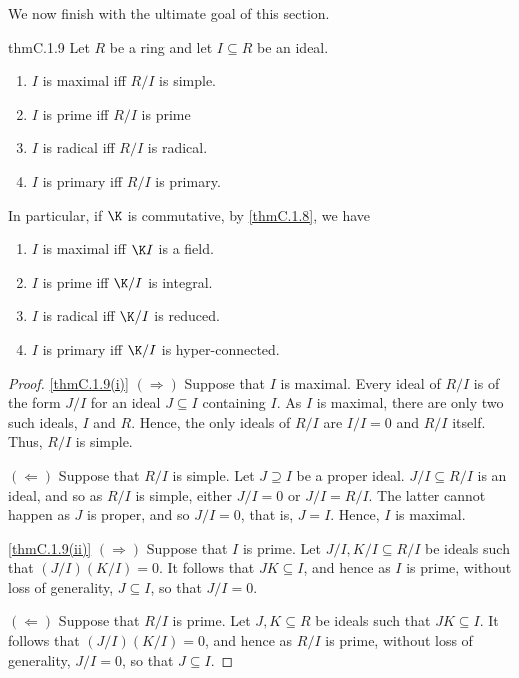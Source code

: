 We now finish with the ultimate goal of this section.
\begin{thm}{}{thmC.1.9}
	Let $R$ be a ring and let $I\subseteq R$ be an ideal.
	\begin{enumerate}
		\item \label{thmC.1.9(i)}$I$ is maximal iff $R/I$ is simple.
		\item \label{thmC.1.9(ii)}$I$ is prime iff $R/I$ is prime
		\item \label{thmC.1.9(iii)}$I$ is radical iff $R/I$ is radical.
		\item \label{thmC.1.9(iv)}$I$ is primary iff $R/I$ is primary.
	\end{enumerate}
	\begin{rmk}
		In particular, if $\K$ is commutative, by \cref{thmC.1.8}, we have
		\begin{enumerate}
			\item $I$ is maximal iff $\K I$ is a field.
			\item $I$ is prime iff $\K/ I$ is integral.
			\item $I$ is radical iff $\K /I$ is reduced.
			\item $I$ is primary iff $\K /I$ is hyper-connected.
		\end{enumerate}
	\end{rmk}
	\begin{proof}
		\cref{thmC.1.9(i)} $(\Rightarrow )$ Suppose that $I$ is maximal.  Every ideal of $R/I$ is of the form $J/I$ for an ideal $J\subseteq I$ containing $I$.  As $I$ is maximal, there are only two such ideals, $I$ and $R$.  Hence, the only ideals of $R/I$ are $I/I=0$ and $R/I$ itself.  Thus, $R/I$ is simple.
		
		$(\Leftarrow )$ Suppose that $R/I$ is simple.  Let $J\supseteq I$ be a proper ideal.  $J/I\subseteq R/I$ is an ideal, and so as $R/I$ is simple, either $J/I=0$ or $J/I=R/I$.  The latter cannot happen as $J$ is proper, and so $J/I=0$, that is, $J=I$.  Hence, $I$ is maximal.
		
		\blni
		\cref{thmC.1.9(ii)} $(\Rightarrow )$ Suppose that $I$ is prime.  Let $J/I,K/I\subseteq R/I$ be ideals such that $(J/I)(K/I)=0$.  It follows that $JK\subseteq I$, and hence as $I$ is prime, without loss of generality, $J\subseteq I$, so that $J/I=0$.
		
		$(\Leftarrow )$ Suppose that $R/I$ is prime.  Let $J,K\subseteq R$ be ideals such that $JK\subseteq I$.  It follows that $(J/I)(K/I)=0$, and hence as $R/I$ is prime, without loss of generality, $J/I=0$, so that $J\subseteq I$.
		

\end{proof}
\end{thm}
